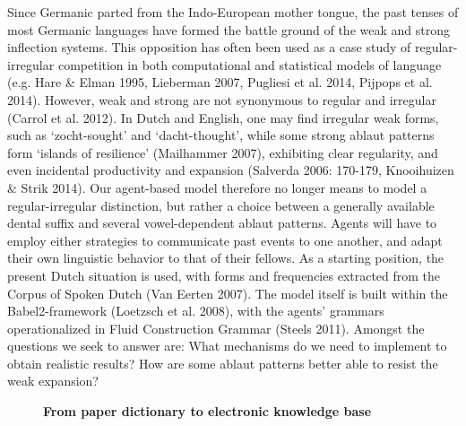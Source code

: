 \documentclass[10pt, a4paper, twopage, headinclude, footinclude, BCOR5mm]{scrartcl}
\begin{document}
{{\noindent
Since Germanic parted from the Indo-European mother tongue, the past tenses of most Germanic languages have formed the battle ground of the weak and strong inflection systems. This opposition has often been used as a case study of regular-irregular competition in both computational and statistical models of language (e.g. Hare \& Elman 1995, Lieberman 2007, Pugliesi et al. 2014, Pijpops et al. 2014). However, weak and strong are not synonymous to regular and irregular (Carrol et al. 2012). In Dutch and English, one may find irregular weak forms, such as `zocht-sought' and `dacht-thought', while some strong ablaut patterns form ‘islands of resilience’ (Mailhammer 2007), exhibiting clear regularity, and even incidental productivity and expansion (Salverda 2006: 170-179, Knooihuizen \& Strik 2014).  Our agent-based model therefore no longer means to model a regular-irregular distinction, but rather a choice between a generally available dental suffix and several vowel-dependent ablaut patterns. Agents will have to employ either strategies to communicate past events to one another, and adapt their own linguistic behavior to that of their fellows. As a starting position, the present Dutch situation is used, with forms and frequencies extracted from the Corpus of Spoken Dutch (Van Eerten 2007). The model itself is built within the Babel2-framework (Loetzsch et al. 2008), with the agents’ grammars operationalized in Fluid Construction Grammar (Steels 2011). Amongst the questions we seek to answer are: What mechanisms do we need to implement to obtain realistic results? How are some ablaut patterns better able to resist the weak expansion?


\newpage

\begin{figure}[t!]
\centering
\large\textbf{From paper dictionary to electronic knowledge base}
\vspace*{0.5cm}
\end{figure}


        \begin{table}[t!]
\end{table}}}
\end{document}
